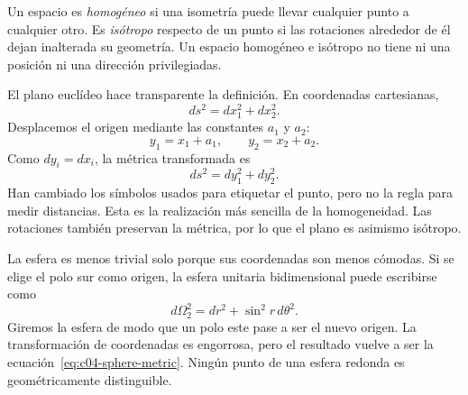 \begin{definition}
Un espacio es \emph{homogéneo} si una isometría puede llevar cualquier punto a cualquier otro. Es \emph{isótropo} respecto de un punto si las rotaciones alrededor de él dejan inalterada su geometría. Un espacio homogéneo e isótropo no tiene ni una posición ni una dirección privilegiadas.
\end{definition}

El plano euclídeo hace transparente la definición. En coordenadas cartesianas,
\begin{equation}
ds^2=dx_1^2+dx_2^2.
\label{eq:c04-flat-metric}
\end{equation}
Desplacemos el origen mediante las constantes \(a_1\) y \(a_2\):
\begin{equation}
y_1=x_1+a_1,
\qquad
y_2=x_2+a_2.
\label{eq:c04-flat-translation}
\end{equation}
Como \(dy_i=dx_i\), la métrica transformada es
\begin{equation}
ds^2=dy_1^2+dy_2^2.
\end{equation}
Han cambiado los símbolos usados para etiquetar el punto, pero no la regla para medir distancias. Esta es la realización más sencilla de la homogeneidad. Las rotaciones también preservan la métrica, por lo que el plano es asimismo isótropo.

La esfera es menos trivial solo porque sus coordenadas son menos cómodas. Si se elige el polo sur como origen, la esfera unitaria bidimensional puede escribirse como
\begin{equation}
d\Omega_2^2=dr^2+\sin^2 r\,d\theta^2.
\label{eq:c04-sphere-metric}
\end{equation}
Giremos la esfera de modo que un polo este pase a ser el nuevo origen. La transformación de coordenadas es engorrosa, pero el resultado vuelve a ser la ecuación~\eqref{eq:c04-sphere-metric}. Ningún punto de una esfera redonda es geométricamente distinguible.

\begin{classroomqa}
\end{classroomqa}

